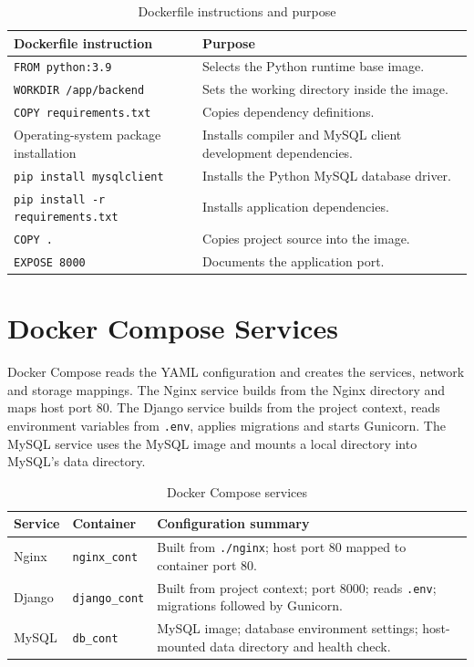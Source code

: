 \documentclass[12pt,a4paper,oneside]{report}
\begin{document}
\begin{table}[H]
\centering
\begin{tabularx}{\textwidth}{|p{}|X|}
\hline
\textbf{Dockerfile instruction} & \textbf{Purpose}\\ \hline
\texttt{FROM python:3.9} & Selects the Python runtime base image.\\ \hline
\texttt{WORKDIR /app/backend} & Sets the working directory inside the image.\\ \hline
\texttt{COPY requirements.txt} & Copies dependency definitions.\\ \hline
Operating-system package installation & Installs compiler and MySQL client development dependencies.\\ \hline
\texttt{pip install mysqlclient} & Installs the Python MySQL database driver.\\ \hline
\texttt{pip install -r requirements.txt} & Installs application dependencies.\\ \hline
\texttt{COPY .} & Copies project source into the image.\\ \hline
\texttt{EXPOSE 8000} & Documents the application port.\\ \hline
\end{tabularx}
\caption{Dockerfile instructions and purpose}
\label{tab:dockerfile}
\end{table}

\section{Docker Compose Services}
Docker Compose reads the YAML configuration and creates the services, network and storage mappings. The Nginx service builds from the Nginx directory and maps host port 80. The Django service builds from the project context, reads environment variables from \texttt{.env}, applies migrations and starts Gunicorn. The MySQL service uses the MySQL image and mounts a local directory into MySQL's data directory.

\begin{table}[H]
\centering
\begin{tabularx}{\textwidth}{|p{}|p{}|X|}
\hline
\textbf{Service} & \textbf{Container} & \textbf{Configuration summary}\\ \hline
Nginx & \texttt{nginx\_cont} & Built from \texttt{./nginx}; host port 80 mapped to container port 80.\\ \hline
Django & \texttt{django\_cont} & Built from project context; port 8000; reads \texttt{.env}; migrations followed by Gunicorn.\\ \hline
MySQL & \texttt{db\_cont} & MySQL image; database environment settings; host-mounted data directory and health check.\\ \hline
\end{tabularx}
\caption{Docker Compose services}
\label{tab:services}
\end{table}
\end{document}
